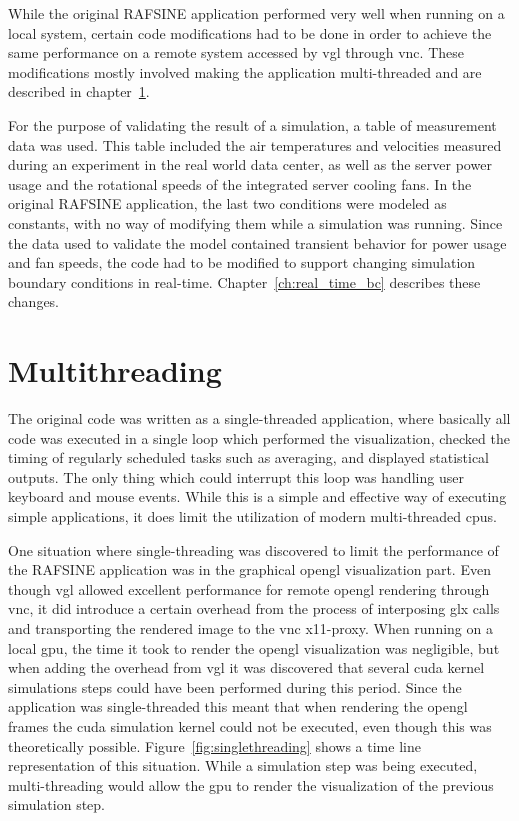 While the original RAFSINE application performed very well when running on a local system, certain code modifications had to be done in order to achieve the same performance on a remote system accessed by \gls{vgl} through \gls{vnc}. These modifications mostly involved making the application multi-threaded and are described in chapter~\ref{ch:multithreading}.

For the purpose of validating the result of a simulation, a table of measurement data was used. This table included the air temperatures and velocities measured during an experiment in the real world data center, as well as the server power usage and the rotational speeds of the integrated server cooling fans. In the original RAFSINE application, the last two conditions were modeled as constants, with no way of modifying them while a simulation was running. Since the data used to validate the model contained transient behavior for power usage and fan speeds, the code had to be modified to support changing simulation boundary conditions in real-time. Chapter~\ref{ch:real_time_bc} describes these changes.

\section{Multithreading}\label{ch:multithreading}
The original code was written as a single-threaded application, where basically all code was executed in a single loop which performed the visualization, checked the timing of regularly scheduled tasks such as averaging, and displayed statistical outputs. The only thing which could interrupt this loop was handling user keyboard and mouse events. While this is a simple and effective way of executing simple applications, it does limit the utilization of modern multi-threaded \gls{cpu}s.

One situation where single-threading was discovered to limit the performance of the RAFSINE application was in the graphical \gls{opengl} visualization part. Even though \gls{vgl} allowed excellent performance for remote \gls{opengl} rendering through \gls{vnc}, it did introduce a certain overhead from the process of interposing \gls{glx} calls and transporting the rendered image to the \gls{vnc} \gls{x11}-proxy. When running on a local \gls{gpu}, the time it took to render the \gls{opengl} visualization was negligible, but when adding the overhead from \gls{vgl} it was discovered that several \gls{cuda} kernel simulations steps could have been performed during this period.  Since the application was single-threaded this meant that when rendering the \gls{opengl} frames the \gls{cuda} simulation kernel could not be executed, even though this was theoretically possible. Figure~\ref{fig:singlethreading} shows a time line representation of this situation. While a simulation step was being executed, multi-threading would allow the \gls{gpu} to render the visualization of the previous simulation step.

